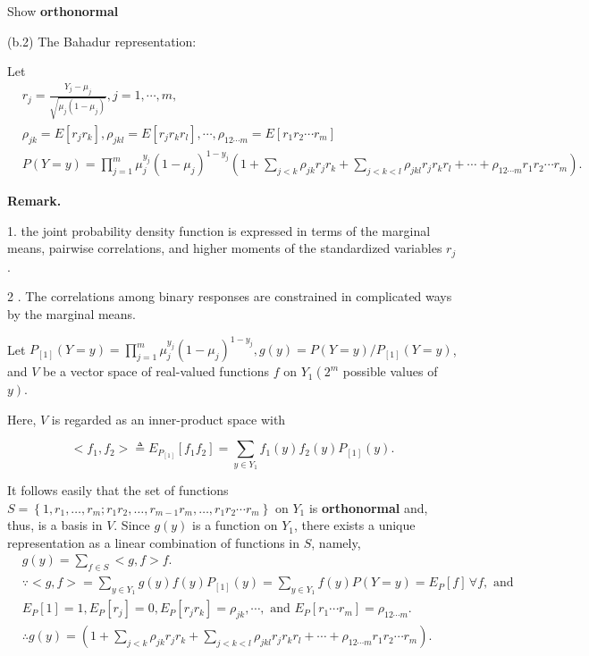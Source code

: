 \documentclass[UTF8,a4paper,10pt]{article}
\begin{document}
\pagebreak
\begin{Problem}[]{Show  \textbf{orthonormal}}

  (b.2) The Bahadur representation:

  Let
$$
\begin{aligned}
& r_j=\frac{Y_j-\mu_j}{\sqrt{\mu_j\left(1-\mu_j\right)}}, j=1, \cdots, m, \\
&\rho_{j k}=E\left[r_j r_k\right], \rho_{j k l}=E\left[r_j r_k r_l\right], \cdots, \rho_{12 \cdots m}=E\left[r_1 r_2 \cdots r_m\right] \\
& P(Y=y)=\prod_{j=1}^m \mu_j^{y_j}\left(1-\mu_j\right)^{1-y_j}\left(1+\sum_{j<k} \rho_{j k} r_j r_k+\sum_{j<k<l} \rho_{j k l} r_j r_k r_l+\cdots+\rho_{12 \cdots m} r_1 r_2 \cdots r_m\right) . 
\end{aligned}
$$


\textbf{ Remark. }

1. the joint probability density function is expressed in terms of the marginal means, pairwise correlations, and higher moments of the standardized variables $r_j$.

2 . The correlations among binary responses are constrained in complicated ways by the marginal means.

\dotfill

Let $P_{[1]}(Y=y)=\prod_{j=1}^m \mu_j^{y_j}\left(1-\mu_j\right)^{1-y_j}, g(y)=P(Y=y) / P_{[1]}(Y=y)$, and $V$ be a vector space of real-valued functions $f$ on $Y_1\left(2^m\right.$ possible values of $\left.y\right)$. 

Here, $V$ is regarded as an inner-product space with

\[ <f_1, f_2>\triangleq E_{P_{[1]}}\left[f_1 f_2\right]=\sum_{y \in Y_1} f_1(y) f_2(y) P_{[1]}(y).\]

It follows easily that the set of functions $S=\left\{1, r_1, \ldots, r_m ; r_1 r_2, \ldots, r_{m-1} r_m , \ldots, r_1 r_2 \cdots r_m\right\}$ on $Y_1$ is \textbf{orthonormal} and, thus, is a basis in $V$.
 Since $g(y)$ is a function on $Y_1$, there exists a unique representation as a linear combination of functions in $S$, namely,
$$
\begin{aligned}
& g(y)=\sum_{f \in S}<g, f>f . \\
& \because<g, f>=\sum_{y \in Y_1} g(y) f(y) P_{[1]}(y)=\sum_{y \in Y_1} f(y) P(Y=y)=E_P[f] \,\forall f, \text { and } \\
& E_P[1]=1, E_P\left[r_j\right]=0, E_P\left[r_j r_k\right]=\rho_{j k}, \cdots, \text { and } E_P\left[r_1 \cdots r_m\right]=\rho_{12 \cdots m} . \\
& \therefore g(y)=\left(1+\sum_{j<k} \rho_{j k} r_j r_k+\sum_{j<k<l} \rho_{j k l} r_j r_k r_l+\cdots+\rho_{12 \cdots m} r_1 r_2 \cdots r_m\right) .
\end{aligned}
$$
\end{Problem}
\end{document}
